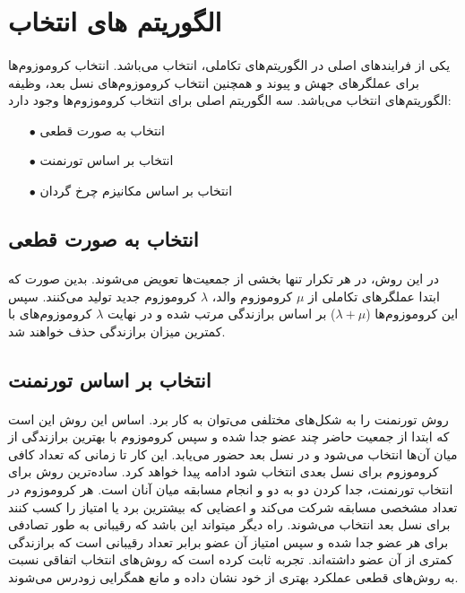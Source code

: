 \documentclass[a4paper,titlepage,12pt,fleqn,oneside]{report}
\begin{document}
	\section{الگوریتم های انتخاب}
	\paragraph{}
	یکی از فرایند‌های اصلی در الگوریتم‌های تکاملی، انتخاب می‌باشد. انتخاب کروموزوم‌ها برای عملگر‌های جهش و پیوند و همچنین انتخاب کروموزوم‌های نسل بعد، وظیفه الگوریتم‌های انتخاب می‌باشد. سه الگوریتم اصلی برای انتخاب کروموزوم‌ها وجود دارد:
	\begin{itemize}
		\item[$\bullet$]
		انتخاب به صورت قطعی
		\item[$\bullet$] 
		انتخاب بر اساس تورنمنت
		\item[$\bullet$] 
		انتخاب بر اساس مکانیزم چرخ گردان
	\end{itemize}
	\subsection{انتخاب به صورت قطعی}
	\paragraph{}
	در این روش، در هر تکرار تنها بخشی از جمعیت‌ها تعویض می‌شوند. بدین صورت که ابتدا عملگر‌های تکاملی از $\mu$ کروموزوم والد، $\lambda$ کروموزوم جدید تولید می‌کنند. سپس این کروموزوم‌ها ($\lambda+\mu$) بر اساس برازندگی مرتب شده و در نهایت $\lambda$ کروموزوم‌های با کمترین میزان برازندگی حذف خواهند شد.
	\subsection{انتخاب بر اساس تورنمنت}
	\paragraph{}
	روش تورنمنت را به شکل‌های مختلفی می‌توان به کار برد. اساس این روش این است که ابتدا از جمعیت حاضر چند عضو جدا شده و سپس کروموزوم با بهترین برازندگی از میان آن‌ها انتخاب می‌شود و در نسل بعد حضور می‌یابد. این کار تا زمانی که تعداد کافی کروموزوم برای نسل بعدی انتخاب شود ادامه پیدا خواهد کرد. ساده‌ترین روش برای انتخاب تورنمنت، جدا کردن دو به دو و انجام مسابقه میان آنان است. هر کروموزوم در تعداد مشخصی مسابقه شرکت می‌کند و اعضایی که بیشترین برد یا امتیاز را کسب کنند برای نسل بعد انتخاب می‌شوند. راه دیگر میتواند این باشد که رقیبانی به طور تصادفی برای هر عضو جدا شده و سپس امتیاز آن عضو برابر تعداد رقیبانی است که برازندگی کمتری از آن عضو داشته‌ا‌ند. تجربه ثابت کرده است که روش‌های انتخاب اتفاقی نسبت به روش‌های قطعی عملکرد بهتری از خود نشان داده و مانع همگرایی زودرس می‌شوند.
	
\end{document}
